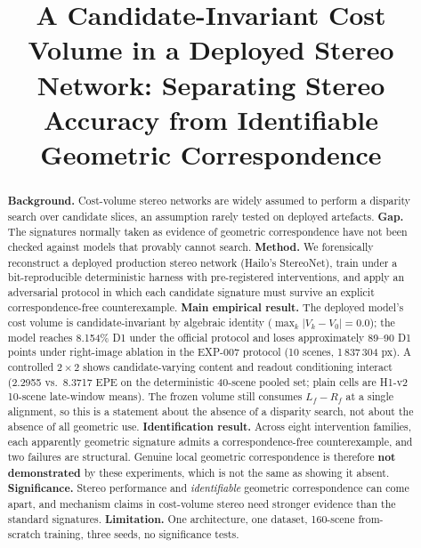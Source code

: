 \documentclass[conference]{IEEEtran}
\begin{document}
\title{A Candidate-Invariant Cost Volume in a Deployed Stereo Network: Separating Stereo Accuracy from Identifiable Geometric Correspondence}

\author{
}
\maketitle

\begin{abstract}
\textbf{Background.} Cost-volume stereo networks are widely assumed to perform a disparity search over candidate slices, an assumption rarely tested on deployed artefacts. \textbf{Gap.} The signatures normally taken as evidence of geometric correspondence have not been checked against models that provably cannot search. \textbf{Method.} We forensically reconstruct a deployed production stereo network (Hailo's StereoNet), train under a bit-reproducible deterministic harness with pre-registered interventions, and apply an adversarial protocol in which each candidate signature must survive an explicit correspondence-free counterexample. \textbf{Main empirical result.} The deployed model's cost volume is candidate-invariant by algebraic identity ($\max_k |V_k - V_0| = 0.0$); the model reaches 8.154\% D1 under the official protocol and loses approximately 89--90 D1 points under right-image ablation in the EXP-007 protocol (10 scenes, 1\,837\,304 px). A controlled $2\times2$ shows candidate-varying content and readout conditioning interact (2.2955 vs.\ 8.3717 EPE on the deterministic 40-scene pooled set; plain cells are H1-v2 10-scene late-window means). The frozen volume still consumes $L_f - R_f$ at a single alignment, so this is a statement about the absence of a disparity search, not about the absence of all geometric use. \textbf{Identification result.} Across eight intervention families, each apparently geometric signature admits a correspondence-free counterexample, and two failures are structural. Genuine local geometric correspondence is therefore \textbf{not demonstrated} by these experiments, which is not the same as showing it absent. \textbf{Significance.} Stereo performance and \emph{identifiable} geometric correspondence can come apart, and mechanism claims in cost-volume stereo need stronger evidence than the standard signatures. \textbf{Limitation.} One architecture, one dataset, 160-scene from-scratch training, three seeds, no significance tests.
\end{abstract}
\end{document}
